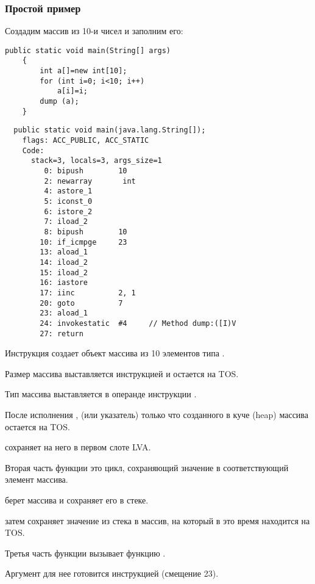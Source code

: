 \subsubsection{Простой пример}

Создадим массив из 10-и чисел и заполним его:

\begin{lstlisting}[style=customjava]
	public static void main(String[] args) 
	{
		int a[]=new int[10];
		for (int i=0; i<10; i++)
			a[i]=i;
		dump (a);
	}
\end{lstlisting}

\begin{lstlisting}
  public static void main(java.lang.String[]);
    flags: ACC_PUBLIC, ACC_STATIC
    Code:
      stack=3, locals=3, args_size=1
         0: bipush        10
         2: newarray       int
         4: astore_1      
         5: iconst_0      
         6: istore_2      
         7: iload_2       
         8: bipush        10
        10: if_icmpge     23
        13: aload_1       
        14: iload_2       
        15: iload_2       
        16: iastore       
        17: iinc          2, 1
        20: goto          7
        23: aload_1       
        24: invokestatic  #4     // Method dump:([I)V
        27: return        
\end{lstlisting}

Инструкция  создает объект массива из 10 элементов типа .

Размер массива выставляется инструкцией  и остается на \ac{TOS}.

Тип массива выставляется в операнде инструкции .

После исполнения ,  (или указатель) только что созданного 
в куче (heap) массива остается на \ac{TOS}.

 сохраняет  на него в первом слоте \ac{LVA}.

Вторая часть функции \main это цикл, сохраняющий значение  в соответствующий
элемент массива.

 берет  массива и сохраняет его в стеке.

 затем сохраняет значение из стека в массив, 
 на который в это время находится на \ac{TOS}.

Третья часть функции \main вызывает функцию .

Аргумент для нее готовится инструкцией  (смещение 23).

